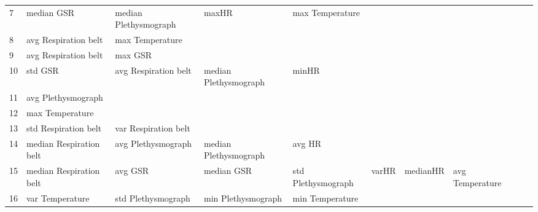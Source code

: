 \begin{landscape}
\begin{table}[]
\begin{tabular}{l|llllllll}
7        & median GSR              & median Plethysmograph & maxHR                   & max Temperature         &                         &                       &                      &          &                      &        \\
8        & avg Respiration belt    & max Temperature       &                         &                         &                         &                       &                      &          &                      &        \\
9        & avg Respiration belt    & max GSR               &                         &                         &                         &                       &                      &          &                      &        \\
10       & std GSR                 & avg Respiration belt  & median Plethysmograph   & minHR                   &                         &                       &                      &          &                      &        \\
11       & avg Plethysmograph      &                       &                         &                         &                         &                       &                      &          &                      &        \\
12       & max Temperature         &                       &                         &                         &                         &                       &                      &          &                      &        \\
13       & std Respiration belt    & var Respiration belt  &                         &                         &                         &                       &                      &          &                      &        \\
14       & median Respiration belt & avg Plethysmograph    & median Plethysmograph   & avg HR                  &                         &                       &                      &          &                      &        \\
15       & median Respiration belt & avg GSR               & median GSR              & std Plethysmograph      & varHR                   & medianHR              & avg Temperature      &          &                      &        \\
16       & var Temperature         & std Plethysmograph    & min Plethysmograph      & min Temperature         &                         &                       &                      &          &                      &        \\

\end{tabular}
\end{table}
\end{landscape}
